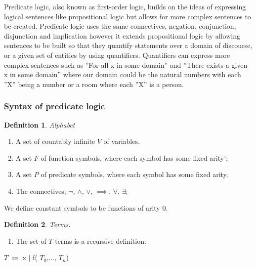 \documentclass{article}%
\newtheorem{definition}{Definition}
\begin{document}
Predicate logic, also known as first-order logic, builds on the ideas of expressing logical sentences like propositional logic but allows for more complex sentences to be created. Predicate logic uses the same connectives, negation, conjunction, disjunction and implication however it extends propositional logic by allowing sentences to be built so that they quantify statements over a domain of discourse, or a given set of entities by using quantifiers. Quantifiers can express more complex sentences such as ”For all x in some domain” and ”There exists a given x in some domain” where our domain could be the natural numbers with each ”X” being a number or a room where each ”X” is a person.

\subsubsection{Syntax of predicate logic}
\begin{definition}
Alphabet 
\end{definition}
\begin{enumerate}
\item A set of countably infinite $V$ of variables. 
\item A set $F$ of function symbols, where each symbol has some fixed arity';
\item A set $P$ of predicate symbols, where each symbol has some fixed arity. 
\item The connectives, $\neg$, $\land$, $\lor$, $\implies$, $\forall$, $\exists$;
\end{enumerate}
We define constant symbols to be functions of arity 0. 
\begin{definition}
Terms. 
\end{definition}
\begin{enumerate}
\item The set of $T$ terms is a recursive definition: 
\end{enumerate}

\centerline{$T$ $\Coloneqq$ x $\vert$ f( $T_0$,..., $T_n$) }
\end{document}

